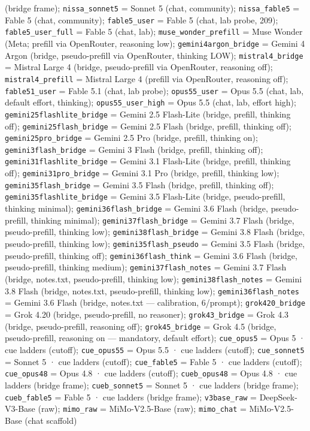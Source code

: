 \documentclass[
  10pt,
]{article}
\begin{document}
(bridge frame); \texttt{nissa\_sonnet5} = Sonnet 5 (chat, community); \texttt{nissa\_fable5} = Fable 5 (chat, community); \texttt{fable5\_user} = Fable 5 (chat, lab probe, 209); \texttt{fable5\_user\_full} = Fable 5 (chat, lab); \texttt{muse\_wonder\_prefill} = Muse Wonder (Meta; prefill via OpenRouter, reasoning low); \texttt{gemini4argon\_bridge} = Gemini 4 Argon (bridge, pseudo-prefill via OpenRouter, thinking LOW); \texttt{mistral4\_bridge} = Mistral Large 4 (bridge, pseudo-prefill via OpenRouter, reasoning off); \texttt{mistral4\_prefill} = Mistral Large 4 (prefill via OpenRouter, reasoning off); \texttt{fable51\_user} = Fable 5.1 (chat, lab probe);
\texttt{opus55\_user} = Opus 5.5 (chat, lab, default effort, thinking); \texttt{opus55\_user\_high} = Opus 5.5 (chat, lab, effort high); \texttt{gemini25flashlite\_bridge} = Gemini 2.5 Flash-Lite (bridge, prefill, thinking off); \texttt{gemini25flash\_bridge} = Gemini 2.5 Flash (bridge, prefill, thinking off); \texttt{gemini25pro\_bridge} = Gemini 2.5 Pro (bridge, prefill, thinking on); \texttt{gemini3flash\_bridge} = Gemini 3 Flash (bridge, prefill, thinking off); \texttt{gemini31flashlite\_bridge} = Gemini 3.1 Flash-Lite (bridge, prefill, thinking off); \texttt{gemini31pro\_bridge} = Gemini 3.1 Pro (bridge, prefill, thinking low); \texttt{gemini35flash\_bridge} = Gemini 3.5 Flash (bridge, prefill, thinking off); \texttt{gemini35flashlite\_bridge} = Gemini 3.5 Flash-Lite (bridge, pseudo-prefill, thinking minimal); \texttt{gemini36flash\_bridge} = Gemini 3.6 Flash (bridge, pseudo-prefill, thinking minimal); \texttt{gemini37flash\_bridge} = Gemini 3.7 Flash (bridge, pseudo-prefill, thinking low); \texttt{gemini38flash\_bridge} = Gemini 3.8 Flash (bridge, pseudo-prefill, thinking low); \texttt{gemini35flash\_pseudo} = Gemini 3.5 Flash (bridge, pseudo-prefill, thinking off); \texttt{gemini36flash\_think} = Gemini 3.6 Flash (bridge, pseudo-prefill, thinking medium); \texttt{gemini37flash\_notes} = Gemini 3.7 Flash (bridge, notes.txt, pseudo-prefill, thinking low); \texttt{gemini38flash\_notes} = Gemini 3.8 Flash (bridge, notes.txt, pseudo-prefill, thinking low); \texttt{gemini36flash\_notes} = Gemini 3.6 Flash (bridge, notes.txt --- calibration, 6/prompt); \texttt{grok420\_bridge} = Grok 4.20 (bridge, pseudo-prefill, no reasoner); \texttt{grok43\_bridge} = Grok 4.3 (bridge, pseudo-prefill, reasoning off); \texttt{grok45\_bridge} = Grok 4.5 (bridge, pseudo-prefill, reasoning on --- mandatory, default effort); \texttt{cue\_opus5} = Opus 5 · cue ladders (cutoff); \texttt{cue\_opus55} = Opus 5.5 · cue ladders (cutoff); \texttt{cue\_sonnet5} = Sonnet 5 · cue ladders (cutoff); \texttt{cue\_fable5} = Fable 5 · cue ladders (cutoff); \texttt{cue\_opus48} = Opus 4.8 · cue ladders (cutoff); \texttt{cueb\_opus48} = Opus 4.8 · cue ladders (bridge frame); \texttt{cueb\_sonnet5} = Sonnet 5 · cue ladders (bridge frame); \texttt{cueb\_fable5} = Fable 5 · cue ladders (bridge frame); \texttt{v3base\_raw} = DeepSeek-V3-Base (raw); \texttt{mimo\_raw} = MiMo-V2.5-Base (raw); \texttt{mimo\_chat} = MiMo-V2.5-Base (chat scaffold)
\end{document}
